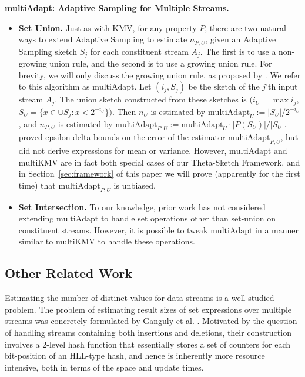 \documentclass{article}
\newcommand{\romIAdapt}{\mathrm{multiAdapt}}
\newcommand{\rommultiKMV}{\textrm{multiKMV}}
\begin{document}
\medskip \noindent \textbf{multiAdapt: Adaptive Sampling for Multiple Streams.}\label{subsubAdapt2}
\begin{itemize}
\item \textbf{Set Union.}
Just as with KMV, for any property $P$, there are two natural ways to extend Adaptive Sampling 
to estimate $n_{P, U}$, given an Adaptive Sampling sketch $S_j$ for each constituent stream $A_j$. 
The first is to use a non-growing union rule, and the second is to use a growing union rule. 
 For brevity, we will
only discuss the growing union rule, as proposed by
\cite{gibbons2001estimating}. We refer to this algorithm as $\romIAdapt$. 
Let $(i_j,S_j)$ be the sketch of the
$j$'th input stream $A_j$.  The union sketch constructed from these
sketches is $(i_U = \max i_j$,\; $S_U = \{x \in \cup S_j\colon x < 2^{-i_U}\})$.  
Then $n_U$ is estimated by $\romIAdapt_U := |S_U| / 2^{-i_U}$,
and $n_{P, U}$ is estimated by $\romIAdapt_{P, U} := \romIAdapt_U \cdot |P(S_U)| / |S_U|$.  
\cite{gibbons2001estimating} proved epsilon-delta bounds on the error of the estimator
$\romIAdapt_{P, U}$, but did not
derive expressions for mean or variance. However, $\romIAdapt$ and $\rommultiKMV$ are in fact both special cases
of our Theta-Sketch Framework, and in Section~\ref{sec:framework}
of this paper we will prove (apparently for the first time) that $\romIAdapt_{P, U}$ is unbiased.

\item \textbf{Set Intersection.} To our knowledge, prior work has not considered extending $\romIAdapt$
to handle set operations other than set-union on constituent streams. However, it is possible to tweak $\romIAdapt$
in a manner similar to $\rommultiKMV$ to handle these operations.
\end{itemize}


\subsection{Other Related Work}
\label{sec:related}
Estimating the number of distinct values for data streams is a well studied problem. The problem of estimating result sizes of set expressions over multiple streams 
was concretely formulated by Ganguly et al. \cite{ganguly2003processing}. 
Motivated by the question of handling streams containing both insertions and deletions, their construction
involves a 2-level hash function that essentially stores a set of counters for each bit-position of an HLL-type hash, 
and hence is inherently more resource intensive, both in terms of the space and update times. 
\end{document}
